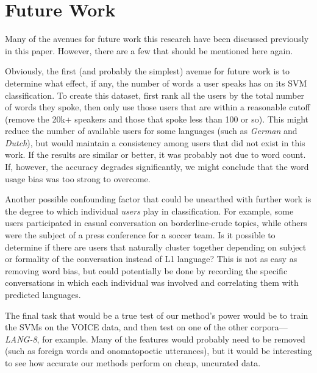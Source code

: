 \documentclass[11pt]{article}
\begin{document}
\section{Future Work}
Many of the avenues for future work this research have been discussed previously in this paper.  However, there are a few that should be mentioned here again.


Obviously, the first (and probably the simplest) avenue for future work is to determine what effect, if any, the number of words a user speaks has on its SVM classification.  To create this dataset, first rank all the users by the total number of words they spoke, then only use those users that are within a reasonable cutoff (remove the 20k+ speakers and those that spoke less than 100 or so).  This might reduce the number of available users for some languages (such as {\it German} and {\it Dutch}), but would maintain a consistency among users that did not exist in this work.  If the results are similar or better, it was probably not due to word count.  If, however, the accuracy degrades significantly, we might conclude that the word usage bias was too strong to overcome.

Another possible confounding factor that could be unearthed with further work is the degree to which individual {\it users} play in classification.  For example, some users participated in casual conversation on borderline-crude topics, while others were the subject of a press conference for a soccer team.  Is it possible to determine if there are users that naturally cluster together depending on subject or formality of the conversation instead of L1 language?  This is not as easy as removing word bias, but could potentially be done by recording the specific conversations in which each individual was involved and correlating them with predicted languages.

The final task that would be a true test of our method's power would be to train the SVMs on the VOICE data, and then test on one of the other corpora---\emph{LANG-8}, for example.  Many of the features would probably need to be removed (such as foreign words and onomatopoetic utterances), but it would be interesting to see how accurate our methods perform on cheap, uncurated data.
\end{document}
